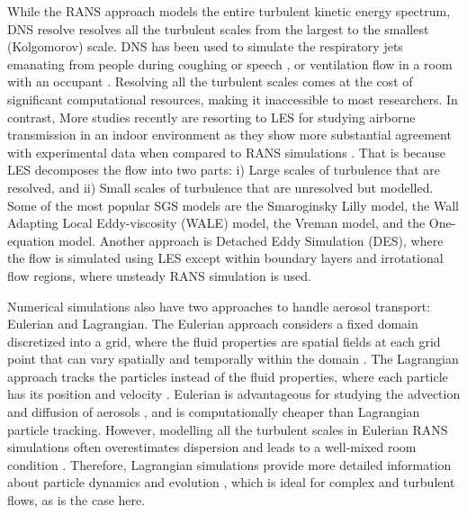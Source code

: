 \documentclass[a4paper,12pt]{elsarticle}
\begin{document}
While the RANS approach models the entire turbulent kinetic energy spectrum, DNS resolve resolves all the turbulent scales from the largest to the smallest (Kolgomorov) \cite{kolmogorov1941local} scale. DNS has been used to simulate the respiratory jets emanating from people during coughing \cite{rosti2020fluid,diwan2020understanding, chong2021extended} or speech \cite{giri2022colliding, singhal2022virus}, or ventilation flow in a room with an occupant \cite{yerragolam2024effect}. Resolving all the turbulent scales comes at the cost of significant computational resources, making it inaccessible to most researchers. In contrast, More studies recently are resorting to LES for studying airborne transmission in an indoor environment \cite{vuorinen2020modelling,feng2020study,khosronejad2020fluid} as they show more substantial agreement with experimental data when compared to RANS simulations \cite{wu2023numerical}. That is because LES decomposes the flow into two parts: i) Large scales of turbulence that are resolved, and ii) Small scales of turbulence that are unresolved but modelled. Some of the most popular SGS models are the Smaroginsky Lilly model, the Wall Adapting Local Eddy-viscosity (WALE) model, the Vreman model, and the One-equation model. Another approach is Detached Eddy Simulation (DES), where the flow is simulated using LES except within boundary layers and irrotational flow regions, where unsteady RANS simulation is used.

Numerical simulations also have two approaches to handle aerosol transport: Eulerian and Lagrangian. The Eulerian approach considers a fixed domain discretized into a grid, where the fluid properties are spatial fields at each grid point that can vary spatially and temporally within the domain \cite{ferziger2002computational}. The Lagrangian approach tracks the particles instead of the fluid properties, where each particle has its position and velocity \cite{gualtieri2017lagrangian}. Eulerian is advantageous for studying the advection and diffusion of aerosols \cite{pan2022boundary,pan2023predicting}, and is computationally cheaper than Lagrangian particle tracking. However, modelling all the turbulent scales in Eulerian RANS simulations often overestimates dispersion and leads to a well-mixed room condition \cite{ou2022insufficient}. Therefore, Lagrangian simulations provide more detailed information about particle dynamics and evolution \cite{xu2023cfd}, which is ideal for complex and turbulent flows, as is the case here.
\end{document}

